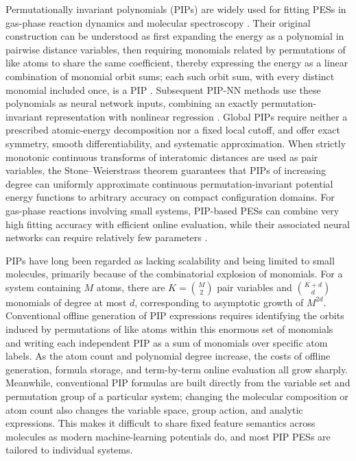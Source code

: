 Permutationally invariant polynomials (PIPs) are widely used for fitting PESs in gas-phase reaction dynamics and molecular spectroscopy \cite{Braams2009PIP,Qu2018PIPReview}.
Their original construction can be understood as first expanding the energy as a polynomial in pairwise distance variables, then requiring monomials related by permutations of like atoms to share the same coefficient, thereby expressing the energy as a linear combination of monomial orbit sums; each such orbit sum, with every distinct monomial included once, is a PIP \cite{Xie2010MSA}.
Subsequent PIP-NN methods use these polynomials as neural network inputs, combining an exactly permutation-invariant representation with nonlinear regression \cite{Jiang2013PIPNN,Li2013PIPNN2}.
Global PIPs require neither a prescribed atomic-energy decomposition nor a fixed local cutoff, and offer exact symmetry, smooth differentiability, and systematic approximation.
When strictly monotonic continuous transforms of interatomic distances are used as pair variables, the Stone--Weierstrass theorem\cite{Rudin1976Principles} guarantees that PIPs of increasing degree can uniformly approximate continuous permutation-invariant potential energy functions to arbitrary accuracy on compact configuration domains.
For gas-phase reactions involving small systems, PIP-based PESs can combine very high fitting accuracy with efficient online evaluation, while their associated neural networks can require relatively few parameters \cite{Houston2022PIPGradients,Jiang2013PIPNN,Li2013PIPNN2}.

PIPs have long been regarded as lacking scalability and being limited to small molecules, primarily because of the combinatorial explosion of monomials.
For a system containing \(M\) atoms, there are \(K=\binom{M}{2}\) pair variables and \(\binom{K+d}{d}\) monomials of degree at most \(d\), corresponding to asymptotic growth of \(M^{2d}\).
Conventional offline generation of PIP expressions requires identifying the orbits induced by permutations of like atoms within this enormous set of monomials and writing each independent PIP as a sum of monomials over specific atom labels.
As the atom count and polynomial degree increase, the costs of offline generation, formula storage, and term-by-term online evaluation all grow sharply.
Meanwhile, conventional PIP formulas are built directly from the variable set and permutation group of a particular system; changing the molecular composition or atom count also changes the variable space, group action, and analytic expressions.
This makes it difficult to share fixed feature semantics across molecules as modern machine-learning potentials do, and most PIP PESs are tailored to individual systems.

